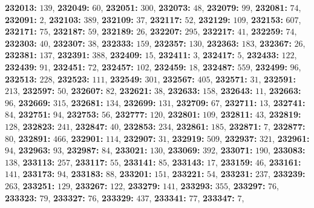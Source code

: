 \textsf{\bfseries 232013:} $139$, \textsf{\bfseries 232049:} $60$, \textsf{\bfseries 232051:} $300$, \textsf{\bfseries 232073:} $48$, \textsf{\bfseries 232079:} $99$, \textsf{\bfseries 232081:} $74$, \textsf{\bfseries 232091:} $2$, \textsf{\bfseries 232103:} $389$, \textsf{\bfseries 232109:} $37$, \textsf{\bfseries 232117:} $52$, \textsf{\bfseries 232129:} $109$, \textsf{\bfseries 232153:} $607$, \textsf{\bfseries 232171:} $75$, \textsf{\bfseries 232187:} $59$, \textsf{\bfseries 232189:} $26$, \textsf{\bfseries 232207:} $295$, \textsf{\bfseries 232217:} $41$, \textsf{\bfseries 232259:} $74$, \textsf{\bfseries 232303:} $40$, \textsf{\bfseries 232307:} $38$, \textsf{\bfseries 232333:} $159$, \textsf{\bfseries 232357:} $130$, \textsf{\bfseries 232363:} $183$, \textsf{\bfseries 232367:} $26$, \textsf{\bfseries 232381:} $137$, \textsf{\bfseries 232391:} $388$, \textsf{\bfseries 232409:} $15$, \textsf{\bfseries 232411:} $3$, \textsf{\bfseries 232417:} $5$, \textsf{\bfseries 232433:} $122$, \textsf{\bfseries 232439:} $91$, \textsf{\bfseries 232451:} $72$, \textsf{\bfseries 232457:} $102$, \textsf{\bfseries 232459:} $18$, \textsf{\bfseries 232487:} $559$, \textsf{\bfseries 232499:} $96$, \textsf{\bfseries 232513:} $228$, \textsf{\bfseries 232523:} $111$, \textsf{\bfseries 232549:} $301$, \textsf{\bfseries 232567:} $405$, \textsf{\bfseries 232571:} $31$, \textsf{\bfseries 232591:} $213$, \textsf{\bfseries 232597:} $50$, \textsf{\bfseries 232607:} $82$, \textsf{\bfseries 232621:} $38$, \textsf{\bfseries 232633:} $158$, \textsf{\bfseries 232643:} $11$, \textsf{\bfseries 232663:} $96$, \textsf{\bfseries 232669:} $315$, \textsf{\bfseries 232681:} $134$, \textsf{\bfseries 232699:} $131$, \textsf{\bfseries 232709:} $67$, \textsf{\bfseries 232711:} $13$, \textsf{\bfseries 232741:} $84$, \textsf{\bfseries 232751:} $94$, \textsf{\bfseries 232753:} $56$, \textsf{\bfseries 232777:} $120$, \textsf{\bfseries 232801:} $109$, \textsf{\bfseries 232811:} $43$, \textsf{\bfseries 232819:} $128$, \textsf{\bfseries 232823:} $241$, \textsf{\bfseries 232847:} $40$, \textsf{\bfseries 232853:} $234$, \textsf{\bfseries 232861:} $185$, \textsf{\bfseries 232871:} $7$, \textsf{\bfseries 232877:} $80$, \textsf{\bfseries 232891:} $466$, \textsf{\bfseries 232901:} $114$, \textsf{\bfseries 232907:} $31$, \textsf{\bfseries 232919:} $509$, \textsf{\bfseries 232937:} $321$, \textsf{\bfseries 232961:} $94$, \textsf{\bfseries 232963:} $93$, \textsf{\bfseries 232987:} $84$, \textsf{\bfseries 233021:} $130$, \textsf{\bfseries 233069:} $392$, \textsf{\bfseries 233071:} $190$, \textsf{\bfseries 233083:} $138$, \textsf{\bfseries 233113:} $257$, \textsf{\bfseries 233117:} $55$, \textsf{\bfseries 233141:} $85$, \textsf{\bfseries 233143:} $17$, \textsf{\bfseries 233159:} $46$, \textsf{\bfseries 233161:} $141$, \textsf{\bfseries 233173:} $94$, \textsf{\bfseries 233183:} $88$, \textsf{\bfseries 233201:} $151$, \textsf{\bfseries 233221:} $54$, \textsf{\bfseries 233231:} $237$, \textsf{\bfseries 233239:} $263$, \textsf{\bfseries 233251:} $129$, \textsf{\bfseries 233267:} $122$, \textsf{\bfseries 233279:} $141$, \textsf{\bfseries 233293:} $355$, \textsf{\bfseries 233297:} $76$, \textsf{\bfseries 233323:} $79$, \textsf{\bfseries 233327:} $76$, \textsf{\bfseries 233329:} $437$, \textsf{\bfseries 233341:} $77$, \textsf{\bfseries 233347:} $7$, 
